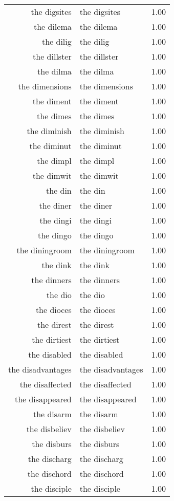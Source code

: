 \begin{table}[ht]
\begin{tabular}{rlr}
  the digsites & the digsites & 1.00 \\ 
  the dilema & the dilema & 1.00 \\ 
  the dilig & the dilig & 1.00 \\ 
  the dillster & the dillster & 1.00 \\ 
  the dilma & the dilma & 1.00 \\ 
  the dimensions & the dimensions & 1.00 \\ 
  the diment & the diment & 1.00 \\ 
  the dimes & the dimes & 1.00 \\ 
  the diminish & the diminish & 1.00 \\ 
  the diminut & the diminut & 1.00 \\ 
  the dimpl & the dimpl & 1.00 \\ 
  the dimwit & the dimwit & 1.00 \\ 
  the din & the din & 1.00 \\ 
  the diner & the diner & 1.00 \\ 
  the dingi & the dingi & 1.00 \\ 
  the dingo & the dingo & 1.00 \\ 
  the diningroom & the diningroom & 1.00 \\ 
  the dink & the dink & 1.00 \\ 
  the dinners & the dinners & 1.00 \\ 
  the dio & the dio & 1.00 \\ 
  the dioces & the dioces & 1.00 \\ 
  the direst & the direst & 1.00 \\ 
  the dirtiest & the dirtiest & 1.00 \\ 
  the disabled & the disabled & 1.00 \\ 
  the disadvantages & the disadvantages & 1.00 \\ 
  the disaffected & the disaffected & 1.00 \\ 
  the disappeared & the disappeared & 1.00 \\ 
  the disarm & the disarm & 1.00 \\ 
  the disbeliev & the disbeliev & 1.00 \\ 
  the disburs & the disburs & 1.00 \\ 
  the discharg & the discharg & 1.00 \\ 
  the dischord & the dischord & 1.00 \\ 
  the disciple & the disciple & 1.00 \\ 

\end{tabular}
\end{table}
